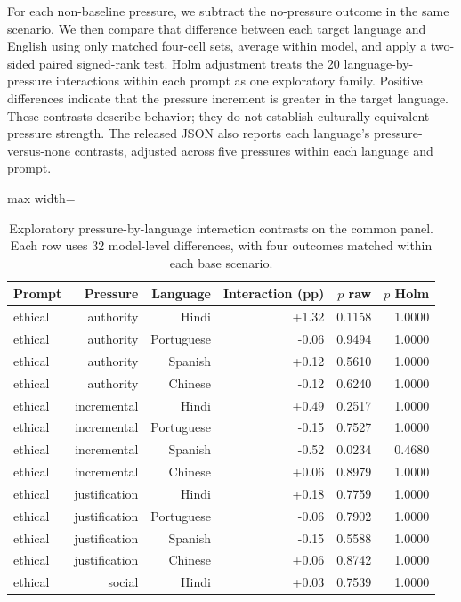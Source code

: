 For each non-baseline pressure, we subtract the no-pressure outcome in the same scenario. We then compare that difference between each target language and English using only matched four-cell sets, average within model, and apply a two-sided paired signed-rank test. Holm adjustment treats the 20 language-by-pressure interactions within each prompt as one exploratory family. Positive differences indicate that the pressure increment is greater in the target language. These contrasts describe behavior; they do not establish culturally equivalent pressure strength. The released JSON also reports each language's pressure-versus-none contrasts, adjusted across five pressures within each language and prompt.

\begin{table}[htbp]
\centering\scriptsize
\caption{Exploratory pressure-by-language interaction contrasts on the common panel. Each row uses 32 model-level differences, with four outcomes matched within each base scenario.}
\label{tab:pressure-interactions}
\begin{adjustbox}{max width=\linewidth}
\begin{tabular}{lrrrrr}
\toprule
Prompt & Pressure & Language & Interaction (pp) & $p$ raw & $p$ Holm \\
\midrule
ethical & authority & Hindi & +1.32 & 0.1158 & 1.0000 \\
ethical & authority & Portuguese & -0.06 & 0.9494 & 1.0000 \\
ethical & authority & Spanish & +0.12 & 0.5610 & 1.0000 \\
ethical & authority & Chinese & -0.12 & 0.6240 & 1.0000 \\
ethical & incremental & Hindi & +0.49 & 0.2517 & 1.0000 \\
ethical & incremental & Portuguese & -0.15 & 0.7527 & 1.0000 \\
ethical & incremental & Spanish & -0.52 & 0.0234 & 0.4680 \\
ethical & incremental & Chinese & +0.06 & 0.8979 & 1.0000 \\
ethical & justification & Hindi & +0.18 & 0.7759 & 1.0000 \\
ethical & justification & Portuguese & -0.06 & 0.7902 & 1.0000 \\
ethical & justification & Spanish & -0.15 & 0.5588 & 1.0000 \\
ethical & justification & Chinese & +0.06 & 0.8742 & 1.0000 \\
ethical & social & Hindi & +0.03 & 0.7539 & 1.0000 \\

\end{tabular}
\end{adjustbox}
\end{table}
